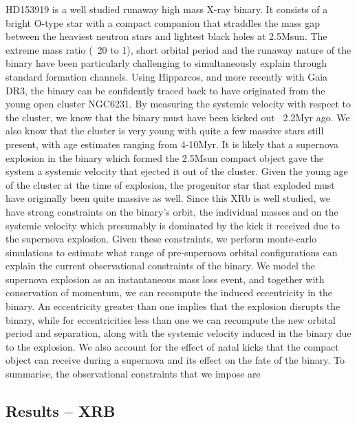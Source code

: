\documentclass[linenumbers,trackchanges,twocolumn]{aastex701}
\begin{document}
HD153919 is a well studied runaway high mass X-ray binary. It consists of a bright O-type star with a compact companion that straddles the mass gap between the heaviest neutron stars and lightest black holes at 2.5Msun. The extreme mass ratio (~20 to 1), short orbital period and the runaway nature of the binary have been particularly challenging to simultaneously explain through standard formation channels. Using Hipparcos, and more recently with Gaia DR3, the binary can be confidently traced back to have originated from the young open cluster NGC6231. By measuring the systemic velocity with respect to the cluster, we know that the binary must have been kicked out ~2.2Myr ago. We also know that the cluster is very young with quite a few massive stars still present, with age estimates ranging from 4-10Myr. It is likely that a supernova explosion in the binary which formed the 2.5Msun compact object gave the system a systemic velocity that ejected it out of the cluster. Given the young age of the cluster at the time of explosion, the progenitor star that exploded must have originally been quite massive as well. Since this XRb is well studied, we have strong constraints on the binary's orbit, the individual masses and on the systemic velocity which presumably is dominated by the kick it received due to the supernova explosion. Given these constraints, we perform monte-carlo simulations to estimate what range of pre-supernova orbital configurations can explain the current observational constraints of the binary. We model the supernova explosion as an instantaneous mass loss event, and together with conservation of momentum, we can recompute the induced eccentricity in the binary. An eccentricity greater than one implies that the explosion disrupts the binary, while for eccentricities less than one we can recompute the new orbital period and separation, along with the systemic velocity induced in the binary due to the explosion. We also account for the effect of natal kicks that the compact object can receive during a supernova and its effect on the fate of the binary. To summarise, the observational constraints that we impose are

\subsection{Results -- XRB}
\end{document}
